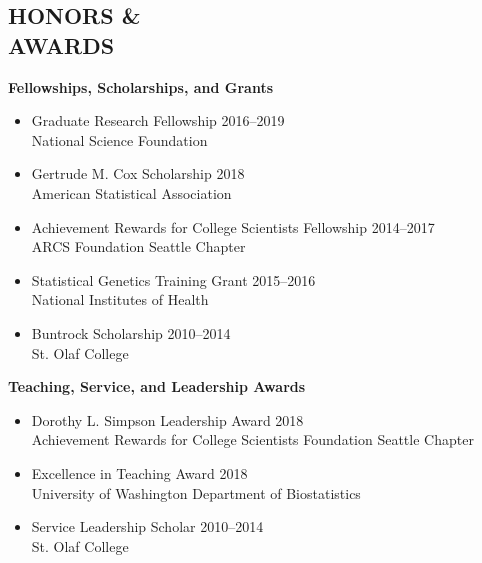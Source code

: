 \documentclass[margin]{res}
\begin{document}
\begin{resume}
					
\section{HONORS \& \\ AWARDS}

\textbf{Fellowships, Scholarships, and Grants}
\begin{itemize} 
\item Graduate Research Fellowship \hfill 2016--2019 \\
National Science Foundation  
\item Gertrude M. Cox Scholarship \hfill 2018 \\ American Statistical Association
\item Achievement Rewards for College Scientists Fellowship \hfill 2014--2017 \\
ARCS Foundation Seattle Chapter
\item Statistical Genetics Training Grant \hfill 2015--2016  \\
National Institutes of Health 
\item Buntrock Scholarship \hfill 2010--2014 \\ St. Olaf College \\
\end{itemize}

\textbf{Teaching, Service, and Leadership Awards}
\begin{itemize}
\item Dorothy L. Simpson Leadership Award \hfill 2018 \\ Achievement Rewards for College Scientists Foundation Seattle Chapter 
\item Excellence in Teaching Award  \hfill 2018 \\
University of Washington Department of Biostatistics
\item Service Leadership Scholar \hfill 2010--2014 \\ St. Olaf College \\
\end{itemize}


\end{resume}
\end{document}
